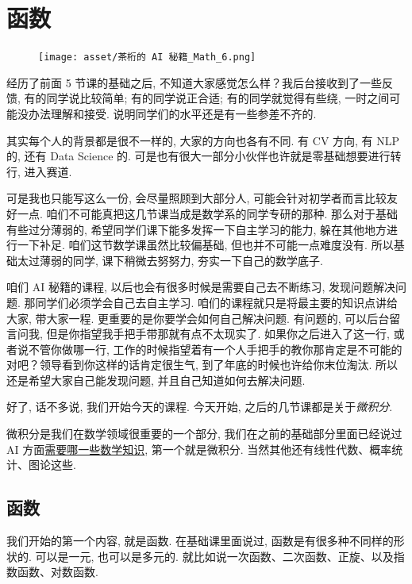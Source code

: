 \chapter{函数}

\begin{figure}[ht]
  \centering
  \texttt{[image: asset/茶桁的 AI 秘籍\_Math\_6.png]}
\end{figure}

\newpage

经历了前面 5 节课的基础之后, 不知道大家感觉怎么样？我后台接收到了一些反馈, 有的同学说比较简单; 有的同学说正合适; 有的同学就觉得有些绕, 一时之间可能没办法理解和接受. 说明同学们的水平还是有一些参差不齐的. 

其实每个人的背景都是很不一样的, 大家的方向也各有不同. 有 CV 方向, 有 NLP 的, 还有 Data Science 的. 可是也有很大一部分小伙伴也许就是零基础想要进行转行, 进入赛道. 

可是我也只能写这么一份, 会尽量照顾到大部分人, 可能会针对初学者而言比较友好一点. 咱们不可能真把这几节课当成是数学系的同学专研的那种. 那么对于基础有些过分薄弱的, 希望同学们课下能多发挥一下自主学习的能力, 躲在其他地方进行一下补足. 咱们这节数学课虽然比较偏基础, 但也并不可能一点难度没有. 所以基础太过薄弱的同学, 课下稍微去努努力, 夯实一下自己的数学底子. 

咱们 AI 秘籍的课程, 以后也会有很多时候是需要自己去不断练习, 发现问题解决问题. 那同学们必须学会自己去自主学习. 咱们的课程就只是将最主要的知识点讲给大家, 带大家一程. 更重要的是你要学会如何自己解决问题. 有问题的, 可以后台留言问我, 但是你指望我手把手带那就有点不太现实了. 如果你之后进入了这一行, 或者说不管你做哪一行, 工作的时候指望着有一个人手把手的教你那肯定是不可能的对吧？领导看到你这样的话肯定很生气, 到了年底的时候也许给你末位淘汰. 所以还是希望大家自己能发现问题, 并且自己知道如何去解决问题. 

好了, 话不多说, 我们开始今天的课程. 今天开始, 之后的几节课都是关于\textit{微积分}. 

微积分是我们在数学领域很重要的一个部分, 我们在之前的基础部分里面已经说过 AI 方面\hyperlink{数学如何运用于 AI}{需要哪一些数学知识}, 第一个就是微积分. 当然其他还有线性代数、概率统计、图论这些. 

\hypertarget{6.微积分-函数}{}
\section{函数}

我们开始的第一个内容, 就是函数. 在基础课里面说过, 函数是有很多种不同样的形状的. 可以是一元, 也可以是多元的. 就比如说一次函数、二次函数、正旋、以及指数函数、对数函数. 


